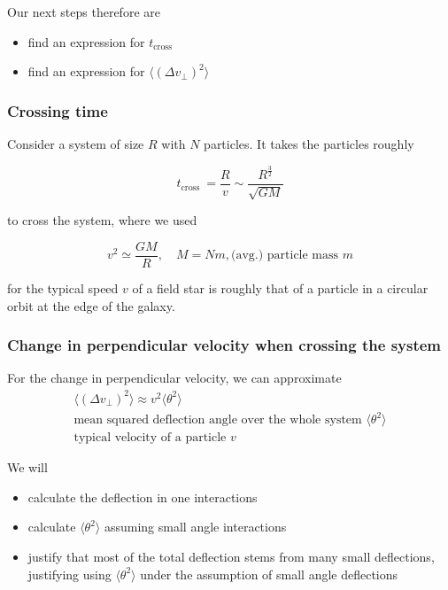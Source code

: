 Our next steps therefore are
\begin{itemize}
    \item find an expression for $t_\text{cross}$
    \item find an expression for $\langle (\Delta v_\perp)^2 \rangle$
\end{itemize}

\subsubsection{Crossing time}

Consider a system of size $R$ with $N$ particles. It takes the particles
roughly

\begin{equation}
    t_{\text {cross }}=\frac{R}{v} \sim \frac{R^{\frac{3}{2}}}{\sqrt{G M}}
\end{equation}

to cross the system, where we used

\begin{equation}
    v^2 \simeq \frac{G M}{R}, \quad M=N m, \text{(avg.) particle mass } m
\end{equation}

for the typical speed $v$ of a field star is 
roughly that of a particle in a circular 
orbit at the edge of the galaxy.


\subsubsection{Change in perpendicular velocity when crossing the system}
For the change in perpendicular velocity, we can approximate
\begin{equation}
    \begin{gathered}
        \langle (\Delta v_\perp)^2 \rangle \approx v^2 \langle \theta^2 \rangle \\
        \text{mean squared deflection angle over the whole system } \langle \theta^2 \rangle \\
        \text{typical velocity of a particle } v
    \end{gathered}
\end{equation}

We will
\begin{itemize}
    \item calculate the deflection in one interactions
    \item calculate $\langle \theta^2 \rangle$ assuming small angle interactions
    \item justify that most of the total deflection stems from many small deflections, justifying using $\langle \theta^2 \rangle$ under the assumption of small angle deflections
\end{itemize}

